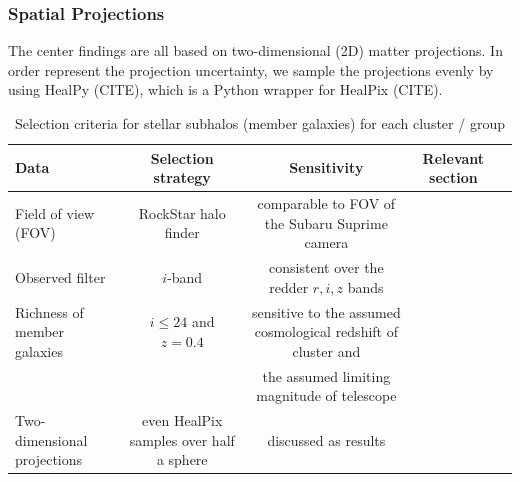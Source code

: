 \documentclass[usenatbib]{mn2e}
\begin{document}
\subsubsection{Spatial Projections}
The center findings are all based on two-dimensional (2D) matter projections.
In order represent the projection uncertainty, we sample the projections evenly
by using HealPy (CITE), which is a Python wrapper for HealPix (CITE).


\begin{table}
\begin{center}
\begin{minipage}{180mm} 
	\caption{ Selection criteria for stellar subhalos (member galaxies) for each
		cluster / group 
\label{tab:member_galaxy_selections}} 
	\begin{tabular}{@{}lcccc@{}}
\hline 
Data &  Selection strategy  & Sensitivity & Relevant section  \\ \hline
Field of view (FOV) & RockStar halo finder& comparable to FOV of the Subaru
Suprime camera &   \\ 
Observed filter & $i$-band & consistent over the redder $r, i, z$ bands &   \\ 
Richness of member galaxies & $i \leq 24$ and $z = 0.4$  & sensitive to
the assumed cosmological redshift of cluster and &    \\ 
& & the assumed limiting magnitude of telescope &   \\
Two-dimensional projections & even HealPix samples over half a sphere &
discussed as results  & \\  
\hline
\end{tabular} 
\label{tab:inputs} 
\footnotesize{
}
\end{minipage}
\end{center} 
\end{table}
\end{document}

